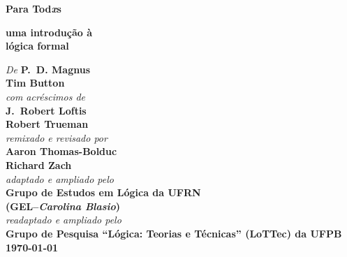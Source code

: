

\pagestyle{empty}

\vspace*{80pt}

\begin{raggedleft}
\fontsize{30pt}{24pt}\sffamily
\selectfont
  \textbf{Para Tod{\fontsize{37pt}{24pt}\selectfont\rmfamily\textit{x}}s}

\medskip\fontsize{18pt}{20pt}\selectfont

\textbf{uma introdução à\\ lógica formal}


\vfill
\fontsize{12pt}{16pt}\selectfont \textit{De } \textbf{P.~D. Magnus}\\
\textbf{Tim Button}\\
\textit{com acréscimos de}\\
\textbf{J.~Robert Loftis}\\
\textbf{Robert Trueman}\\
\textit{remixado e revisado por}\\
\textbf{Aaron Thomas-Bolduc}\\ \textbf{Richard Zach}\\
\textit{adaptado e ampliado  pelo}\\ \textbf{Grupo de Estudos em Lógica da UFRN \\ (GEL--\textit{Carolina Blasio})}\\
\textit{readaptado e ampliado pelo} \\ \textbf{Grupo de Pesquisa ``Lógica: Teorias e Técnicas'' (LoTTec) da UFPB}\\


\vfill
\textbf{\today}\par
\end{raggedleft}


\newpage

\thispagestyle{empty}
\onecolumn
\ 
\vfill

